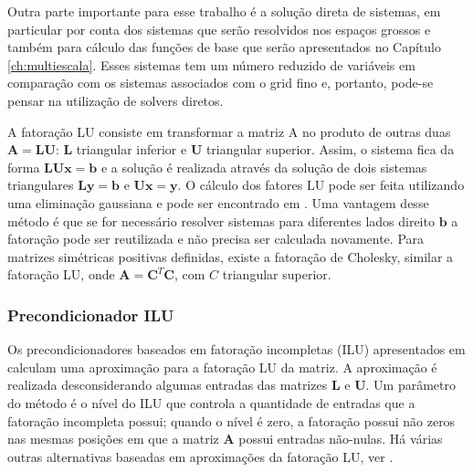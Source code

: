 Outra parte importante para esse trabalho é a solução direta de sistemas, em particular por conta dos sistemas que serão resolvidos nos espaços grossos e também para cálculo das funções de base que serão apresentados no Capítulo \ref{ch:multiescala}. Esses sistemas tem um número reduzido de variáveis em comparação com os sistemas associados com o grid fino e, portanto, pode-se pensar na utilização de solvers diretos.

A fatoração LU consiste em transformar a matriz A no produto de outras duas $\mathbf{A}=\mathbf{L}\mathbf{U}$: $\mathbf{L}$ triangular inferior e $\mathbf{U}$ triangular superior. Assim, o sistema fica da forma $\mathbf{L} \mathbf{U} \mathbf{x} = \mathbf{b}$ e a solução é realizada através da solução de dois sistemas triangulares $\mathbf{L}\mathbf{y} = \mathbf{b}$ e $\mathbf{U}\mathbf{x} = \mathbf{y}$. O cálculo dos fatores LU pode ser feita utilizando uma eliminação gaussiana e pode ser encontrado em \citet{heath1997scientific}. Uma vantagem desse método é que se for necessário resolver sistemas para diferentes lados direito $\mathbf{b}$ a fatoração pode ser reutilizada e não precisa ser calculada novamente. Para matrizes simétricas positivas definidas, existe a fatoração de Cholesky, similar a fatoração LU, onde $\mathbf{A} = \mathbf{C}^T \mathbf{C}$, com $C$ triangular superior.


\subsubsection{Precondicionador ILU}

Os precondicionadores baseados em fatoração incompletas (ILU) apresentados em \citet{ilupaper} calculam uma aproximação para a fatoração LU da matriz. A aproximação é realizada desconsiderando algumas entradas das matrizes $\mathbf{L}$ e $\mathbf{U}$. Um parâmetro do método é o nível do ILU que controla a quantidade de entradas que a fatoração incompleta possui; quando o nível é  zero, a fatoração possui não zeros nas mesmas posições em que a matriz $\mathbf{A}$ possui entradas não-nulas. Há várias outras alternativas baseadas em aproximações da fatoração LU, ver \cite{solverlinear}.

